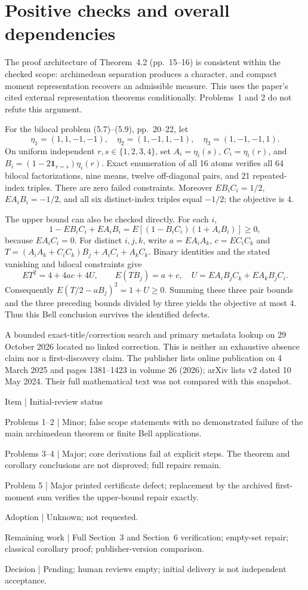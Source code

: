 \documentclass[10pt]{article}
\begin{document}
\section*{Positive checks and overall dependencies}
The proof architecture of Theorem 4.2 (pp. 15–16) is consistent within the checked scope: archimedean separation produces a character, and compact moment representation recovers an admissible measure. This uses the paper’s cited external representation theorems conditionally. Problems 1 and 2 do not refute this argument.\par
For the bilocal problem (5.7)–(5.9), pp. 20–22, let \[\eta_1=(1,1,-1,-1),\quad
 \eta_2=(1,-1,1,-1),\quad
 \eta_3=(1,-1,-1,1).\] On uniform independent \(r,s\in\{1,2,3,4\}\), set \(A_i=\eta_i(s)\), \(C_i=\eta_i(r)\), and \(B_i=(1-2\mathbf1_{r=s})\eta_i(r)\). Exact enumeration of all 16 atoms verifies all 64 bilocal factorizations, nine means, twelve off-diagonal pairs, and 21 repeated-index triples. There are zero failed constraints. Moreover \(E B_iC_i=1/2\), \(E A_iB_i=-1/2\), and all six distinct-index triples equal \(-1/2\); the objective is \(4\).\par
The upper bound can also be checked directly. For each \(i\), \[1-E B_iC_i+E A_iB_i
   =E[(1-B_iC_i)(1+A_iB_i)]\ge0,\] because \(E A_iC_i=0\). For distinct \(i,j,k\), write \(a=E A_iA_k\), \(c=E C_iC_k\) and \(T=(A_iA_k+C_iC_k)B_j+A_iC_i+A_kC_k\). Binary identities and the stated vanishing and bilocal constraints give \[E T^2=4+4ac+4U,\qquad E(TB_j)=a+c,
 \quad U=E A_iB_jC_k+E A_kB_jC_i.\] Consequently \(E(T/2-aB_j)^2=1+U\ge0\). Summing these three pair bounds and the three preceding bounds divided by three yields the objective at most \(4\). Thus this Bell conclusion survives the identified defects.\par
A bounded exact-title/correction search and primary metadata lookup on 29 October 2026 located no linked correction. This is neither an exhaustive absence claim nor a first-discovery claim. The publisher lists online publication on 4 March 2025 and pages 1381–1423 in volume 26 (2026); arXiv lists v2 dated 10 May 2024. Their full mathematical text was not compared with this snapshot.\par
Item | Initial-review status\par
Problems 1–2 | Minor; false scope statements with no demonstrated failure of the main archimedean theorem or finite Bell applications.\par
Problems 3–4 | Major; core derivations fail at explicit steps. The theorem and corollary conclusions are not disproved; full repairs remain.\par
Problem 5 | Major printed certificate defect; replacement by the archived first-moment sum verifies the upper-bound repair exactly.\par
Adoption | Unknown; not requested.\par
Remaining work | Full Section 3 and Section 6 verification; empty-set repair; classical corollary proof; publisher-version comparison.\par
Decision | Pending; human reviews empty; initial delivery is not independent acceptance.\par
\end{document}
